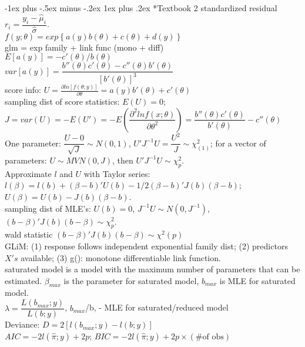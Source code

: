 \documentclass[10pt,landscape]{article}
\makeatletter
\renewcommand{\subsubsection}{\@startsection{subsubsection}{3}{0mm}%
                                {-1ex plus -.5ex minus -.2ex}%
                                {1ex plus .2ex}%
                                {\normalfont\small\bfseries}}
\makeatother
\begin{document}
\begin{multicols}{3}
\subsubsection*{Textbook 2}
\vspace{-5pt}
standardized residual $r_{i}=\dfrac{y_{i}-\hat{\mu}_{i}}{\hat{\sigma}}$. \\
$f\left(y;\theta\right)=exp\left\{ a\left(y\right)b\left(\theta\right)+c\left(\theta\right)+d\left(y\right)\right\} $ \\
glm = exp family + link func (mono + diff)  \\
$E\left[a\left(y\right)\right]=-c'\left(\theta\right)/b\left(\theta\right)$ \\
$var\left[a\left(y\right)\right]=\dfrac{b''\left(\theta\right)c'\left(\theta\right)-c''\left(\theta\right)b'\left(\theta\right)}{\left[b'\left(\theta\right)\right]^{3}}$ \\
score info: $U=\frac{\partial ln[f\left(\theta;y\right)]}{\partial\theta}=a\left(y\right)b'\left(\theta\right)+c'\left(\theta\right)$ \\
sampling dist of score statistics: $E\left(U\right)=0;$ $J=var\left(U\right)=-E\left(U'\right) = -E(\dfrac{\partial^2lnf(x;\theta)}{\partial \theta^2})=\dfrac{b''\left(\theta\right)c'\left(\theta\right)}{b'\left(\theta\right)}-c''\left(\theta\right)$ \\
One parameter: $\dfrac{U-0}{\sqrt{J}} \sim N\left(0,1\right)$, $U'J^{-1}U=\dfrac{U^{2}}{J}\sim\chi_{(1)}^{2}$; for a vector of parameters: $U\sim MVN(0, J)$, then $U'J^{-1}U\sim \chi_p^2$.\\
Approximate $l$ and $U$ with Taylor series: $l(\beta) = l(b) + (\beta - b)'U(b) - 1/2(\beta	- b)'J(b)(\beta	- b)$; $U(\beta	) = U(b) - J(b)(\beta - b)$. \\
sampling dist of MLE's: $U(b) = 0$, $J^{-1}U \sim N(0, J^{-1})$, $(b - \beta)'J(b)(b - \beta) \sim \chi_p^2$. \\
wald statistic $\left(b-\beta\right)'J\left(b\right)\left(b-\beta\right)\sim\chi^{2}\left(p\right)$\\
GLiM: (1) response follows independent exponential family dist; (2) predictors $X's$ available; (3) g(): monotone differentiable link function.\\
saturated model is a model with the maximum number of parameters that can be estimated. $\beta_{max}$ is the parameter for saturated model, $b_{max}$ is MLE for saturated model.	\\
$\lambda=\dfrac{L\left(b_{max};y\right)}{L\left(b;y\right)}$, $b_{max}$/b, - MLE for saturated/reduced model \\
Deviance: $D=2\left[l\left(b_{max};y\right)-l\left(b;y\right)\right]$ \\
$AIC=-2l\left(\hat{\pi};y\right)+2p$; $BIC=-2l\left(\hat{\pi};y\right)+2p\times\left(\#\text{of obs}\right)$ \\

\end{multicols}
\end{document}
